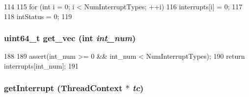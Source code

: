 \begin{DoxyCode}
114     {
115         for (int i = 0; i < NumInterruptTypes; ++i) {
116             interrupts[i] = 0;
117         }
118         intStatus = 0;
119     }
\end{DoxyCode}
\hypertarget{classSparcISA_1_1Interrupts_a87abae3604f8bd69ae89e91881110a39}{
\subsubsection[{get\_\-vec}]{\setlength{\rightskip}{0pt plus 5cm}uint64\_\-t get\_\-vec (int {\em int\_\-num})}}
\label{classSparcISA_1_1Interrupts_a87abae3604f8bd69ae89e91881110a39}



\begin{DoxyCode}
188     {
189         assert(int_num >= 0 && int_num < NumInterruptTypes);
190         return interrupts[int_num];
191     }
\end{DoxyCode}
\hypertarget{classSparcISA_1_1Interrupts_ae603c88d759977611d3bcc6e2deb61ae}{
\subsubsection[{getInterrupt}]{ getInterrupt ({\bf ThreadContext} $\ast$ {\em tc})}}
\label{classSparcISA_1_1Interrupts_ae603c88d759977611d3bcc6e2deb61ae}



